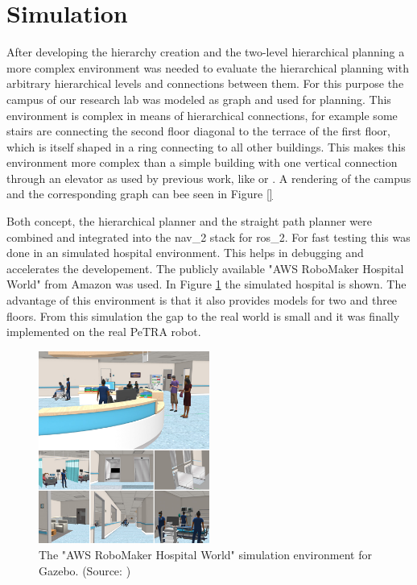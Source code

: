 \section{Simulation}
\label{sec:simulation}
After developing the hierarchy creation and the two-level hierarchical planning a more complex environment was needed to evaluate the hierarchical planning with arbitrary hierarchical levels and connections between them. For this purpose the campus of our research lab was modeled as graph and used for planning. This environment is complex in means of hierarchical connections, for example some stairs are connecting the second floor diagonal to the terrace of the first floor, which is itself shaped in a ring connecting to all other buildings. This makes this environment more complex than a simple building with one vertical connection through an elevator as used by previous work, like \cite{gregoric_autonomous_2022} or \cite{cagigas_hierarchical_2005}. A rendering of the campus and the corresponding graph can bee seen in Figure \ref{}


Both concept, the hierarchical planner and the straight path planner were combined and integrated into the \gls{nav_2} stack for \gls{ros_2}. For fast testing this was done in an simulated hospital environment. This helps in debugging and accelerates the developement. The publicly available "AWS RoboMaker Hospital World" from Amazon \cite{aws_robotics_aws_2023} was used. In Figure \ref{fig:aws_hospital} the simulated hospital is shown. The advantage of this environment is that it also provides models for two and three floors. From this simulation the gap to the real world is small and it was finally implemented on the real PeTRA robot.

\begin{figure}[h]
    \centering
    \includegraphics[width=0.5\textwidth]{figures/30_methods/hospital_world.jpg}
    \caption[The "AWS RoboMaker Hospital World" simulation environment for Gazebo]{The "AWS RoboMaker Hospital World" simulation environment for Gazebo. (Source: \cite{aws_robotics_aws_2023})}
    \label{fig:aws_hospital}
\end{figure}